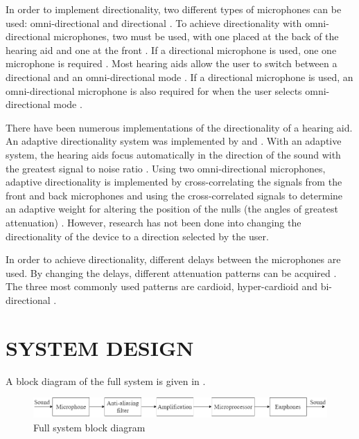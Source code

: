 \documentclass[10pt,twocolumn]{witseiepaper}
\begin{document}
In order to implement directionality, two different types of microphones can be used: omni-directional and directional \cite{An_ultra_low_power_analogue_directionality, trends_in_amplification}. To achieve directionality with omni-directional microphones, two must be used, with one placed at the back of the hearing aid and one at the front \cite{An_ultra_low_power_analogue_directionality, trends_in_amplification}. If a directional microphone is used, one one microphone is required \cite{trends_in_amplification}. Most hearing aids allow the user to switch between a directional and an omni-directional mode \cite{trends_in_amplification}. If a directional microphone is used, an omni-directional microphone is also required for when the user selects omni-directional mode \cite{trends_in_amplification}.

There have been numerous implementations of the directionality of a hearing aid. An adaptive directionality system was implemented by \cite{An_ultra_low_power_analogue_directionality} and \cite{Evaluation_of_digital_hearing_aid_algorithms}. With an adaptive system, the hearing aids focus automatically in the direction of the sound with the greatest signal to noise ratio \cite{An_ultra_low_power_analogue_directionality}. Using two omni-directional microphones, adaptive directionality is implemented by cross-correlating the signals from the front and back microphones and using the cross-correlated signals to determine an adaptive weight for altering the position of the nulls (the angles of greatest attenuation) \cite{An_ultra_low_power_analogue_directionality}. However, research has not been done into changing the directionality of the device to a direction selected by the user.

In order to achieve directionality, different delays between the microphones are used. By changing the delays, different attenuation patterns can be acquired \cite{trends_in_amplification}. The three most commonly used patterns are cardioid, hyper-cardioid and bi-directional \cite{trends_in_amplification}.

\section{SYSTEM DESIGN}

A block diagram of the full system is given in .

\begin{figure}[t]
	\centering
	\includegraphics[width=1\textwidth]{highLeveLSystemDiagram.png}
	\caption{Full system block diagram}
	\raggedright
	\label{fig:block}	
\end{figure}
\end{document}
